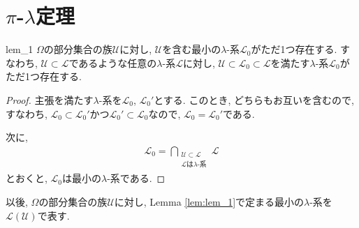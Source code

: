 \section{$\pi$-$\lambda$定理}
\begin{lemma}{}{lem_1}
    $\Omega$の部分集合の族$\mathcal{U}$に対し, $\mathcal{U}$を含む最小の$\lambda$-系$\mathcal{L}_0$がただ1つ存在する.
    すなわち, $\mathcal{U}\subset \mathcal{L}$であるような任意の$\lambda$-系$\mathcal{L}$に対し, $\mathcal{U}\subset \mathcal{L}_0\subset \mathcal{L}$を満たす$\lambda$-系$\mathcal{L}_0$がただ1つ存在する.
\end{lemma}
\begin{proof}
    主張を満たす$\lambda$-系を$\mathcal{L}_0$, $\mathcal{L}_0'$とする.
    このとき, どちらもお互いを含むので, すなわち, $\mathcal{L}_0\subset \mathcal{L}_0'$かつ$\mathcal{L}_0'\subset \mathcal{L}_0$なので, $\mathcal{L}_0=\mathcal{L}_0'$である.

    次に,
    \begin{align*}
        \mathcal{L}_0 = \bigcap_{\substack{\mathcal{{U}}\subset \mathcal{L} \\\text{$\mathcal{L}$は$\lambda$-系}}}\mathcal{L}
    \end{align*}
    とおくと, $\mathcal{L}_0$は最小の$\lambda$-系である.
\end{proof}

以後, $\Omega$の部分集合の族$\mathcal{U}$に対し, Lemma \ref{lem:lem_1}で定まる最小の$\lambda$-系を$\mathcal{L}(\mathcal{U})$で表す.

